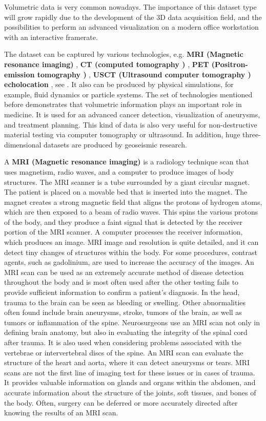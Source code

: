 Volumetric data is very common nowadays. The importance of this dataset type will grow rapidly due to the development of the 3D data acquisition field, and the possibilities to perform an advanced visualization on a modern office workstation with an interactive framerate.


The dataset can be captured by various technologies, e.g. \textbf{  MRI (Magnetic resonance imaging) } , \textbf{ CT (computed tomography ) }, \textbf{PET (Positron-emission tomography ) }, \textbf{ USCT (Ultrasound computer tomography ) echolocation }, see \cite{radiology} . It also can be produced by physical simulations, for example, fluid dynamics or particle systems. The set of technologies mentioned before demonstrates that volumetric information plays an important role in medicine. It is used for an advanced cancer detection, visualization of aneurysms, and treatment planning. This kind of data is also very useful for non-destructive material testing via computer tomography or ultrasound. In addition, huge three-dimensional datasets are produced by geoseismic research.


A \textbf{  MRI (Magnetic resonance imaging) } is a radiology technique scan that uses magnetism, radio waves, and a computer to produce images of body structures. The MRI scanner is a tube surrounded by a giant circular magnet. The patient is placed on a movable bed that is inserted into the magnet. The magnet creates a strong magnetic field that aligns the protons of hydrogen atoms, which are then exposed to a beam of radio waves. This spins the various protons of the body, and they produce a faint signal that is detected by the receiver portion of the MRI scanner. A computer processes the receiver information, which produces an image.
MRI image and resolution is quite detailed, and it can detect tiny changes of structures within the body. For some procedures, contrast agents, such as gadolinium, are used to increase the accuracy of the images. \newline  An MRI scan can be used as an extremely accurate method of disease detection throughout the body and is most often used after the other testing fails to provide sufficient information to confirm a patient's diagnosis. In the head, trauma to the brain can be seen as bleeding or swelling. Other abnormalities often found include brain aneurysms, stroke, tumors of the brain, as well as tumors or inflammation of the spine.  \newline Neurosurgeons use an MRI scan not only in defining brain anatomy, but also in evaluating the integrity of the spinal cord after trauma. It is also used when considering problems associated with the vertebrae or intervertebral discs of the spine. An MRI scan can evaluate the structure of the heart and aorta, where it can detect aneurysms or tears. MRI scans are not the first line of imaging test for these issues or in cases of trauma.  \newline It provides valuable information on glands and organs within the abdomen, and accurate information about the structure of the joints, soft tissues, and bones of the body. Often, surgery can be deferred or more accurately directed after knowing the results of an MRI scan.



